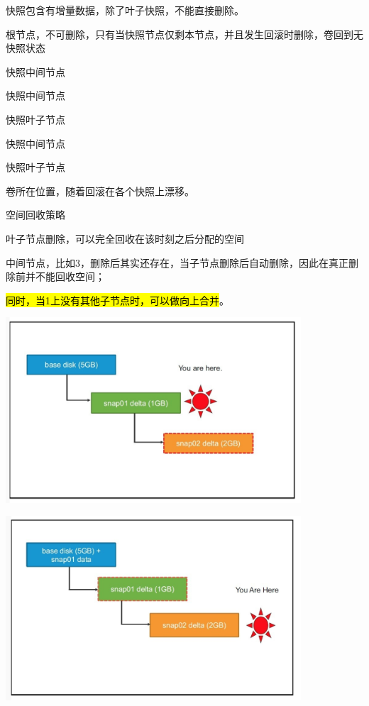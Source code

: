 快照包含有增量数据，除了叶子快照，不能直接删除。
\begin{enumbox}
\item 根节点，不可删除，只有当快照节点仅剩本节点，并且发生回滚时删除，卷回到无快照状态
\item 快照中间节点
\item 快照中间节点
\item 快照叶子节点
\item 快照中间节点
\item 快照叶子节点
\item 卷所在位置，随着回滚在各个快照上漂移。
\end{enumbox}

空间回收策略
\begin{enumbox}
\item 叶子节点删除，可以完全回收在该时刻之后分配的空间
\item 中间节点，比如3，删除后其实还存在，当子节点删除后自动删除，因此在真正删除前并不能回收空间；
\item \hl{同时，当1上没有其他子节点时，可以做向上合并}。
\end{enumbox}

\begin{center}
\includegraphics[width=11cm]{../imgs/snap-delete-leaf.png}
\end{center}

\begin{center}
\includegraphics[width=11cm]{../imgs/snap-delete-non-leaf.png}
\end{center}



